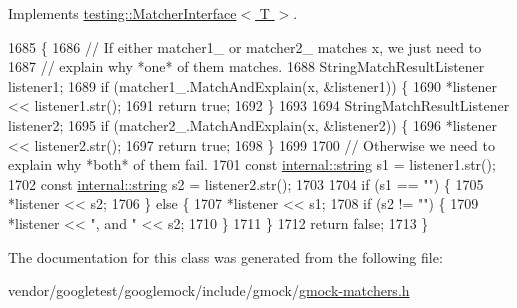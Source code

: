 Implements \hyperlink{classtesting_1_1MatcherInterface_a296b43607cd99d60365f0e6a762777cf}{testing\+::\+Matcher\+Interface$<$ T $>$}.


\begin{DoxyCode}
1685                                                                          \{
1686     \textcolor{comment}{// If either matcher1\_ or matcher2\_ matches x, we just need to}
1687     \textcolor{comment}{// explain why *one* of them matches.}
1688     StringMatchResultListener listener1;
1689     \textcolor{keywordflow}{if} (matcher1\_.MatchAndExplain(x, &listener1)) \{
1690       *listener << listener1.str();
1691       \textcolor{keywordflow}{return} \textcolor{keyword}{true};
1692     \}
1693 
1694     StringMatchResultListener listener2;
1695     \textcolor{keywordflow}{if} (matcher2\_.MatchAndExplain(x, &listener2)) \{
1696       *listener << listener2.str();
1697       \textcolor{keywordflow}{return} \textcolor{keyword}{true};
1698     \}
1699 
1700     \textcolor{comment}{// Otherwise we need to explain why *both* of them fail.}
1701     \textcolor{keyword}{const} \hyperlink{namespacetesting_1_1internal_a8e8ff5b11e64078831112677156cb111}{internal::string} s1 = listener1.str();
1702     \textcolor{keyword}{const} \hyperlink{namespacetesting_1_1internal_a8e8ff5b11e64078831112677156cb111}{internal::string} s2 = listener2.str();
1703 
1704     \textcolor{keywordflow}{if} (s1 == \textcolor{stringliteral}{""}) \{
1705       *listener << s2;
1706     \} \textcolor{keywordflow}{else} \{
1707       *listener << s1;
1708       \textcolor{keywordflow}{if} (s2 != \textcolor{stringliteral}{""}) \{
1709         *listener << \textcolor{stringliteral}{", and "} << s2;
1710       \}
1711     \}
1712     \textcolor{keywordflow}{return} \textcolor{keyword}{false};
1713   \}
\end{DoxyCode}


The documentation for this class was generated from the following file\+:\begin{DoxyCompactItemize}
\item 
vendor/googletest/googlemock/include/gmock/\hyperlink{gmock-matchers_8h}{gmock-\/matchers.\+h}\end{DoxyCompactItemize}
